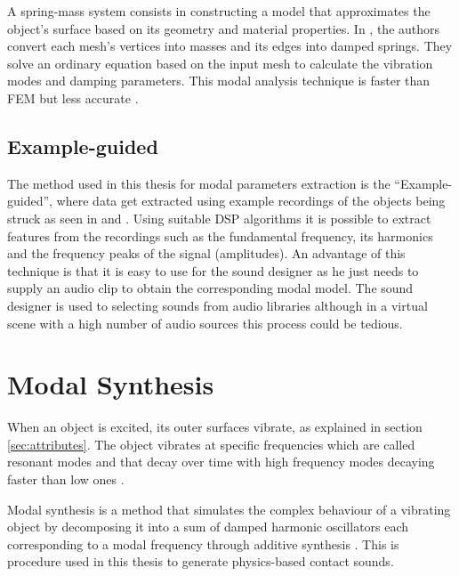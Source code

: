 A spring-mass system consists in constructing a model that approximates the object's surface based on its geometry and material properties. In \cite{raghuvanshi2006interactive}, the authors convert each mesh's vertices into masses and its edges into damped springs. They solve an ordinary equation based on the input mesh to calculate the vibration modes and damping parameters. This modal analysis technique is faster than \gls{FEM} but less accurate \cite{ren2010synthesizing}.

\subsection{Example-guided}\label{sec:exampleguided}

The method used in this thesis for modal parameters extraction is the ``Example-guided'', where data get extracted using example recordings of the objects being struck as seen in \cite{lloyd2011sound} and \cite{ren2013example}. Using suitable \gls{DSP} algorithms it is possible to extract features from the recordings such as the fundamental frequency, its harmonics and the frequency peaks of the signal (amplitudes). An advantage of this technique is that it is easy to use for the sound designer as he just needs to supply an audio clip to obtain the corresponding modal model. The sound designer is used to selecting sounds from audio libraries although in a virtual scene with a high number of audio sources this process could be tedious.

 
\section{Modal Synthesis}\label{sec:modal_synth}


When an object is excited, its outer surfaces vibrate, as explained in section \ref{sec:attributes}. The object vibrates at specific frequencies which are called resonant modes and that decay over time with high frequency modes decaying faster than low ones \cite{lloyd2011sound}. 

Modal synthesis is a method that simulates the complex behaviour of a vibrating object by decomposing it into a sum of damped harmonic oscillators each corresponding to a modal frequency through additive synthesis \cite{bilbao2009numerical}. This is procedure used in this thesis to generate physics-based contact sounds.

